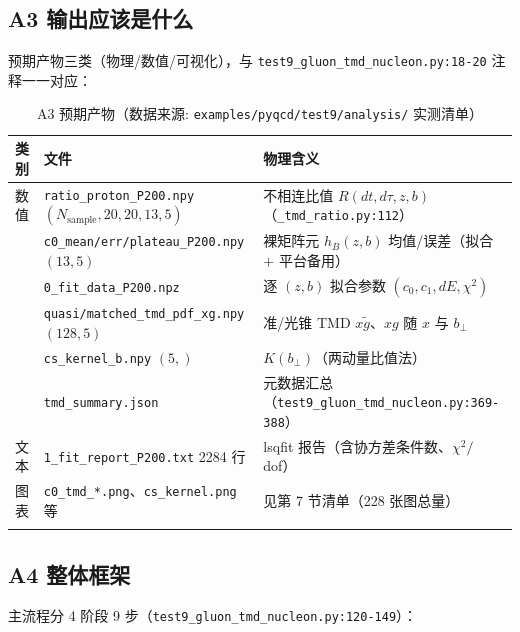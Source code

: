 \documentclass[UTF8]{ctexart}
\begin{document}
\subsection{A3 输出应该是什么}
\label{sec:a3}
预期产物三类（物理/数值/可视化），与 \texttt{\nolinkurl{test9\_gluon\_tmd\_nucleon.py:18-20}} 注释一一对应：

\small
\begin{xltabular}{\textwidth}{llX}
\toprule
类别 & 文件 & 物理含义 \\
\midrule
\endhead
数值 & \texttt{\nolinkurl{ratio\_proton\_P200.npy}} $(N_{\text{sample}},20,20,13,5)$ & 不相连比值 $R(dt,d\tau,z,b)$（\texttt{\nolinkurl{\_tmd\_ratio.py:112}}）\\
 & \texttt{\nolinkurl{c0\_mean/err/plateau\_P200.npy}} $(13,5)$ & 裸矩阵元 $h_B(z,b)$ 均值/误差（拟合 $+$ 平台备用）\\
 & \texttt{\nolinkurl{0\_fit\_data\_P200.npz}} & 逐 $(z,b)$ 拟合参数 $(c_0,c_1,dE,\chi^2)$\\
 & \texttt{\nolinkurl{quasi/matched\_tmd\_pdf\_xg.npy}} $(128,5)$ & 准/光锥 TMD $x\tilde g$、$xg$ 随 $x$ 与 $b_\perp$\\
 & \texttt{\nolinkurl{cs\_kernel\_b.npy}} $(5,)$ & $K(b_\perp)$（两动量比值法）\\
 & \texttt{\nolinkurl{tmd\_summary.json}} & 元数据汇总（\texttt{\nolinkurl{test9\_gluon\_tmd\_nucleon.py:369-388}}）\\
文本 & \texttt{\nolinkurl{1\_fit\_report\_P200.txt}} 2284 行 & lsqfit 报告（含协方差条件数、$\chi^2/$dof）\\
图表 & \texttt{\nolinkurl{c0\_tmd\_*.png}}、\texttt{\nolinkurl{cs\_kernel.png}} 等 & 见第 7 节清单（228 张图总量）\\
\bottomrule
\caption{A3 预期产物（数据来源: \texttt{\nolinkurl{examples/pyqcd/test9/analysis/}} 实测清单）}
\end{xltabular}

\subsection{A4 整体框架}
\label{sec:a4}
主流程分 4 阶段 9 步（\texttt{\nolinkurl{test9\_gluon\_tmd\_nucleon.py:120-149}}）：
\end{document}
